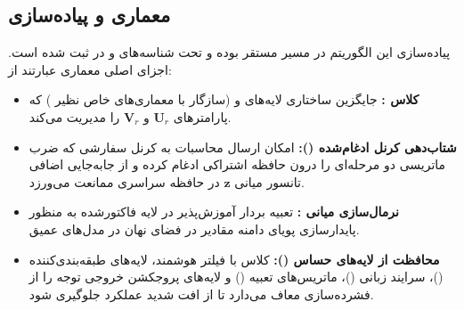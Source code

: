 \subsection{معماری و پیاده‌سازی}
پیاده‌سازی این الگوریتم در مسیر  مستقر بوده و تحت شناسه‌های  و  در  ثبت شده است. اجزای اصلی معماری عبارتند از:
\begin{itemize}
    \item \textbf{کلاس :} جایگزین ساختاری لایه‌های  و  (سازگار با معماری‌های خاص نظیر ) که پارامترهای $\mathbf{U}_r$ و $\mathbf{V}_r$ را مدیریت می‌کند.
    \item \textbf{شتاب‌دهی کرنل ادغام‌شده ():} امکان ارسال محاسبات به کرنل سفارشی  که ضرب ماتریسی دو مرحله‌ای را درون حافظه اشتراکی  ادغام کرده و از جابه‌جایی اضافی تانسور میانی $\mathbf{z}$ در حافظه سراسری ممانعت می‌ورزد.
    \item \textbf{نرمال‌سازی میانی :} تعبیه بردار آموزش‌پذیر  در لایه فاکتورشده به منظور پایدارسازی پویای دامنه مقادیر در فضای نهان در مدل‌های عمیق.
    \item \textbf{محافظت از لایه‌های حساس ():} کلاس  با فیلتر هوشمند، لایه‌های طبقه‌بندی‌کننده ()، سرایند زبانی ()، ماتریس‌های تعبیه () و لایه‌های پروجکشن خروجی توجه را از فشرده‌سازی معاف می‌دارد تا از افت شدید عملکرد جلوگیری شود.
\end{itemize}
